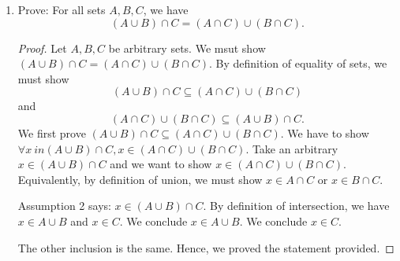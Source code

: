 \documentclass[11pt]{article}
\begin{document}
    \begin{enumerate}
        \item Prove: For all sets \(A,B,C\), we have \[(A \cup B) \cap C = (A \cap C) \cup (B \cap C).\]
        \begin{proof}
            Let \(A,B,C\) be arbitrary sets. We msut show \((A \cup B) \cap C = (A \cap C) \cup (B \cap C).\) By definition of equality of sets, we must show \[(A \cup B) \cap C \subseteq (A \cap C) \cup (B \cap C)\] and \[(A \cap C) \cup (B \cap C) \subseteq (A \cup B) \cap C.\] We first prove \((A \cup B) \cap C \subseteq (A \cap C) \cup (B \cap C)\). We have to show \(\forall x\ in (A \cup B) \cap C, x \in (A \cap C) \cup (B \cap C)\). Take an arbitrary \(x \in (A \cup B) \cap C\) and we want to show \(x \in (A \cap C) \cup (B \cap C)\). Equivalently, by definition of union, we must show \(x \in A \cap C\) or \(x \in B \cap C\). 

            Assumption 2 says: \(x \in (A \cup B) \cap C\). By definition of intersection, we have \(x \in A \cup B\) and \(x \in C\). We conclude \(x \in A \cup B\). We conclude \(x \in C\). 

            The other inclusion is the same. Hence, we proved the statement provided.
        \end{proof}
    \end{enumerate}
\end{document}
